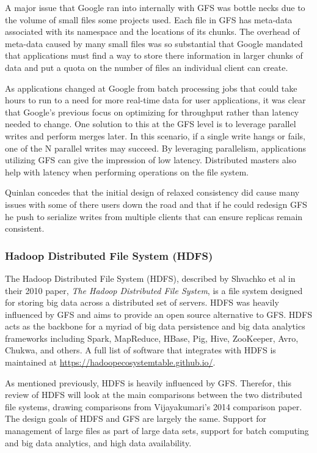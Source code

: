 \documentclass[]{article}
\begin{document}
A major issue that Google ran into internally with GFS was bottle necks due to the volume of small files some projects used. Each file in GFS has meta-data associated with its namespace and the locations of its chunks. The overhead of meta-data caused by many small files was so substantial that Google mandated that applications must find a way to store there information in larger chunks of data and put a quota on the number of files an individual client can create.

As applications changed at Google from batch processing jobs that could take hours to run to a need for more real-time data for user applications, it was clear that Google's previous focus on optimizing for throughput rather than latency needed to change. One solution to this at the GFS level is to leverage parallel writes and perform merges later. In this scenario, if a single write hangs or fails, one of the N parallel writes may succeed. By leveraging parallelism, applications utilizing GFS can give the impression of low latency. Distributed masters also help with latency when performing operations on the file system.

Quinlan concedes that the initial design of relaxed consistency did cause many issues with some of there users down the road and that if he could redesign GFS he push to serialize writes from multiple clients that can ensure replicas remain consistent.


\subsubsection{Hadoop Distributed File System (HDFS)}
The Hadoop Distributed File System (HDFS), described by Shvachko et al in their 2010 paper, \textit{The Hadoop Distributed File System}\cite{shvachko_hadoop_2010}, is a file system designed for storing big data across a distributed set of servers. HDFS was heavily influenced by GFS and aims to provide an open source alternative to GFS. HDFS acts as the backbone for a myriad of big data persistence and big data analytics frameworks including Spark, MapReduce, HBase, Pig, Hive, ZooKeeper, Avro, Chukwa, and others. A full list of software that integrates with HDFS is maintained at \url{https://hadoopecosystemtable.github.io/}\cite{hadoop-ecosystem}. 

As mentioned previously, HDFS is heavily influenced by GFS. Therefor, this review of HDFS will look at the main comparisons between the two distributed file systems, drawing comparisons from Vijayakumari's 2014 comparison paper\cite{vijayakumari_comparative_2014}. The design goals of HDFS and GFS are largely the same. Support for management of large files as part of large data sets, support for batch computing and big data analytics, and high data availability.
\end{document}
